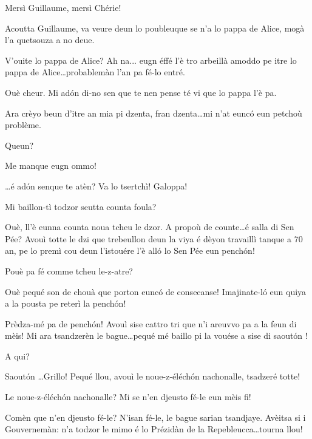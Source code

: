 \begin{drama}
\Alicespeaks Mersì Guillaume, mersì Chérie!

\Cheriespeaks Acoutta Guillaume, va veure deun lo poubleuque se n'a lo pappa de Alice, mogà l'a quetsouza a no deue.

\Guillaumespeaks{} V'ouite lo pappa de Alice? Ah na... eugn éffé l'è tro arbeillà amoddo pe itre lo pappa de Alice\ldots probablemàn l'an pa fé-lo entré.

\Cheriespeaks Ouè cheur.  Mi ad\'on di-no sen que te nen pense té vi que lo pappa l'è pa.

\Alicespeaks Ara crèyo beun d'itre an mia pi dzenta, fran dzenta\ldots mi n'at eunc\'o eun petchoù problème.

\Cheriespeaks Queun?

\Alicespeaks Me manque eugn ommo!

\Cheriespeaks \ldots é ad\'on senque te atèn? Va lo tsertchì! Galoppa!




  
\Vioujspeaks Mi baillon-tì todzor seutta counta foula?

\Vioupspeaks Ouè, ll'è eunna counta noua tcheu le dzor. A propoù de counte\ldots é salla di Sen Pée? Avouì totte le dzi que trebeullon deun la viya é dèyon travaillì tanque a 70 an, pe lo premì cou deun l'istouére l'è all\'o lo Sen Pée eun pench\'on!

\Vioujspeaks Pouè pa fé comme tcheu le-z-atre?

\Vioupspeaks Ouè pequé son de chouà que porton eunc\'o de consecanse! I\-ma\-ji\-na\-te-l\'o eun quiya a la pousta pe reterì la pench\'on! 

\Vioujspeaks Prèdza-mé pa de pench\'on! Avouì sise cattro tri que n'i areuvvo pa a la feun di mèis! Mi ara tsandzerèn le bague\ldots pequé mé baillo pi la vouése a sise di saout\'on !

\Vioupspeaks A qui?

\Vioujspeaks Saout\'on \ldots Grillo! Pequé llou, avouì le noue-z-éléch\'on nachonalle, tsadzeré totte!

\Vioupspeaks Le noue-z-éléch\'on nachonalle? Mi se n'en djeusto fé-le eun mèis fi!

\Vioujspeaks Comèn que n'en djeusto fé-le? N'isan fé-le, le bague sarian tsandjaye. Avèitsa si i Gouvernemàn: n'a todzor le mimo é lo Prézidàn de la Repebleucca\ldots tourna llou!


\end{drama}
